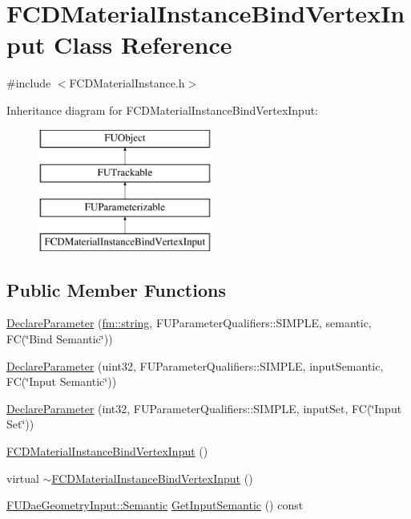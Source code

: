 \hypertarget{classFCDMaterialInstanceBindVertexInput}{
\section{FCDMaterialInstanceBindVertexInput Class Reference}
\label{classFCDMaterialInstanceBindVertexInput}
}


{\ttfamily \#include $<$FCDMaterialInstance.h$>$}

Inheritance diagram for FCDMaterialInstanceBindVertexInput:\begin{figure}[H]
\begin{center}
\leavevmode
\includegraphics[height=4.000000cm]{classFCDMaterialInstanceBindVertexInput}
\end{center}
\end{figure}
\subsection*{Public Member Functions}
\begin{DoxyCompactItemize}
\item 
\hyperlink{classFCDMaterialInstanceBindVertexInput_a658712d13d4d4f26c4e9d14ad3b9f5bf}{DeclareParameter} (\hyperlink{classfm_1_1stringT}{fm::string}, FUParameterQualifiers::SIMPLE, semantic, FC(\char`\"{}Bind Semantic\char`\"{}))
\item 
\hyperlink{classFCDMaterialInstanceBindVertexInput_a60828e98d2582ecfa609e7c04cc48a83}{DeclareParameter} (uint32, FUParameterQualifiers::SIMPLE, inputSemantic, FC(\char`\"{}Input Semantic\char`\"{}))
\item 
\hyperlink{classFCDMaterialInstanceBindVertexInput_ac1870b73cdfe64b0571c1fee93cb2468}{DeclareParameter} (int32, FUParameterQualifiers::SIMPLE, inputSet, FC(\char`\"{}Input Set\char`\"{}))
\item 
\hyperlink{classFCDMaterialInstanceBindVertexInput_ae752c5c495217ca9fc3671c1f8d657b2}{FCDMaterialInstanceBindVertexInput} ()
\item 
virtual \hyperlink{classFCDMaterialInstanceBindVertexInput_a10098c9fde10dc83683132374772e822}{$\sim$FCDMaterialInstanceBindVertexInput} ()
\item 
\hyperlink{namespaceFUDaeGeometryInput_a0f887d29f54b10338ebcf73789a7a061}{FUDaeGeometryInput::Semantic} \hyperlink{classFCDMaterialInstanceBindVertexInput_a3f79f5c625f3eb5087d136a2e38bcb03}{GetInputSemantic} () const 
\end{DoxyCompactItemize}


